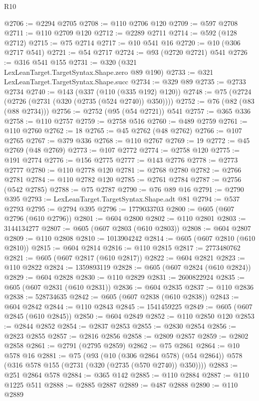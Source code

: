 \begin{lexlean}{R10}
\begin{coremodule}
{{{{{{{{{{{{{{{{{{{{{{{{{{{{{{{{{{{{{{{{{{{{{{{{{{{{{{{{{{{{{{{{{{{{{{{{{{{{{{{{{{{{@2706 := @2294 @2705
@2708 := @110 @2706 @120
@2709 := @597 @2708
@2711 := @110 @2709 @120
@2712 := @2289 @2711
@2714 := @592 (@128 @2712)
@2715 := @75 @2714
@2717 := @10 @541 @16
@2720 := @10 (@306 @2717 @541)
@2721 := @54 @2717
@2724 := @93 (@2720 @2721) @541
@2726 := @316 @541 @155
@2731 := @320 (@321 LexLeanTarget.TargetSyntax.Shape.zero @89 @190)
@2733 := @321 LexLeanTarget.TargetSyntax.Shape.succ
@2734 := @329 @89
@2735 := @2733 @2734
@2740 := @143 (@337 (@110 (@335 @192) @120))
@2748 := @75 (@2724 (@2726 (@2731 (@320 (@2735 (@524 @2740)) @350))))
@2752 := @76 (@82 (@83 (@88 @2734)))
@2756 := @2752 (@95 (@54 @2721)) @541
@2757 := @365 @336
@2758 := @110 @2757
@2759 := @2758 @516
@2760 := @489 @2759
@2761 := @110 @2760
@2762 := 18
@2765 := @45 @2762 (@48 @2762)
@2766 := @107 @2765
@2767 := @379 @336
@2768 := @110 @2767
@2769 := 19
@2772 := @45 @2769 (@48 @2769)
@2773 := @107 @2772
@2774 := @2758 @120
@2775 := @191 @2774
@2776 := @156 @2775
@2777 := @143 @2776
@2778 := @2773 @2777
@2780 := @110 @2778 @120
@2781 := @2768 @2780
@2782 := @2766 @2781
@2784 := @110 @2782 @120
@2785 := @2761 @2784
@2787 := @2756 (@542 @2785)
@2788 := @75 @2787
@2790 := @76 @89 @16
@2791 := @2790 @395
@2793 := LexLeanTarget.TargetSyntax.Shape.adt @81
@2794 := @537 @2793
@2795 := @2794 @395
@2796 := 1779033703
@2800 := @605 (@607 @2796 (@610 @2796))
@2801 := @604 @2800
@2802 := @110 @2801
@2803 := 3144134277
@2807 := @605 (@607 @2803 (@610 @2803))
@2808 := @604 @2807
@2809 := @110 @2808
@2810 := 1013904242
@2814 := @605 (@607 @2810 (@610 @2810))
@2815 := @604 @2814
@2816 := @110 @2815
@2817 := 2773480762
@2821 := @605 (@607 @2817 (@610 @2817))
@2822 := @604 @2821
@2823 := @110 @2822
@2824 := 1359893119
@2828 := @605 (@607 @2824 (@610 @2824))
@2829 := @604 @2828
@2830 := @110 @2829
@2831 := 2600822924
@2835 := @605 (@607 @2831 (@610 @2831))
@2836 := @604 @2835
@2837 := @110 @2836
@2838 := 528734635
@2842 := @605 (@607 @2838 (@610 @2838))
@2843 := @604 @2842
@2844 := @110 @2843
@2845 := 1541459225
@2849 := @605 (@607 @2845 (@610 @2845))
@2850 := @604 @2849
@2852 := @110 @2850 @120
@2853 := @2844 @2852
@2854 := @2837 @2853
@2855 := @2830 @2854
@2856 := @2823 @2855
@2857 := @2816 @2856
@2858 := @2809 @2857
@2859 := @2802 @2858
@2861 := @2791 (@2795 @2859)
@2862 := @75 @2861
@2864 := @10 @578 @16
@2881 := @75
    (@93
      (@10 (@306 @2864 @578) (@54 @2864))
      @578
      (@316 @578 @155 (@2731 (@320 (@2735 (@570 @2740)) @350))))
@2883 := @251 @2864 @578
@2884 := @365 @142
@2885 := @110 @2884
@2887 := @110 @1225 @511
@2888 := @2885 @2887
@2889 := @487 @2888
@2890 := @110 @2889
}}}}}}}}}}}}}}}}}}}}}}}}}}}}}}}}}}}}}}}}}}}}}}}}}}}}}}}}}}}}}}}}}}}}}}}}}}}}}}}}}}}}
\end{coremodule}
\end{lexlean}
